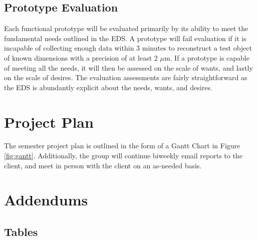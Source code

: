\documentclass{article}
\begin{document}
\subsection{Prototype Evaluation}
Each functional prototype will be evaluated primarily by its ability to meet the fundamental needs outlined in the EDS. A prototype will fail evaluation if it is incapable of collecting enough data within 3 minutes to reconstruct a test object of known dimensions with a precision of at least 2 $\mu$m. If a prototype is capable of meeting all the needs, it will then be assessed on the scale of wants, and lastly on the scale of desires. The evaluation assessments are fairly straightforward as the EDS is abundantly explicit about the needs, wants, and desires. 

\section{ Project Plan}
The semester project plan is outlined in the form of a Gantt Chart in Figure \ref{fig:gantt}. Additionally, the group will continue biweekly email reports to the client, and meet in person with the client on an as-needed basis. 

\section{Addendums}
\label{sec:addendums}

\subsection{Tables}
\label{sec:tables}
\end{document}
